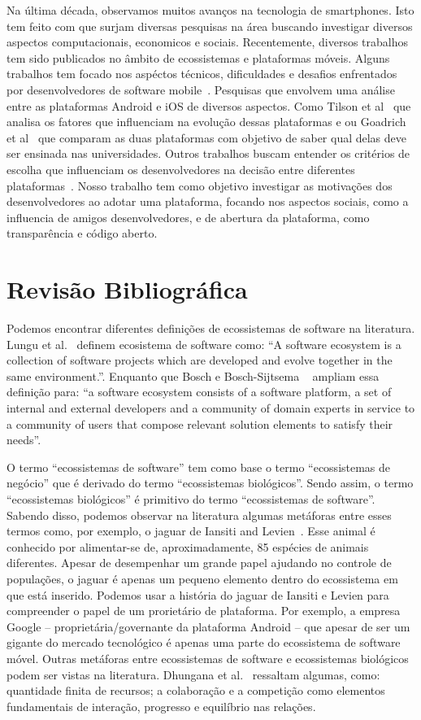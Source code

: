 \documentclass[conference]{IEEEtran}
\begin{document}
Na última década, observamos muitos avanços na tecnologia de smartphones. Isto tem feito com que surjam diversas pesquisas na área buscando investigar diversos aspectos computacionais, economicos e sociais. Recentemente, diversos trabalhos tem sido publicados no âmbito de ecossistemas e plataformas móveis. Alguns trabalhos tem focado nos aspéctos técnicos, dificuldades e desafios enfrentados por desenvolvedores de software mobile~\cite{Joorabchi2013}. Pesquisas que envolvem uma análise entre as plataformas Android e iOS de diversos aspectos. Como Tilson et al~\cite{Tilson2012} que analisa os fatores que influenciam na evolução dessas plataformas e ou Goadrich et al~\cite{Goadrich2011} que comparam as duas plataformas com objetivo de saber qual delas deve ser ensinada nas universidades. Outros trabalhos buscam entender os critérios de escolha que influenciam os desenvolvedores na decisão entre diferentes plataformas~\cite{Koch2014}. Nosso trabalho tem como objetivo investigar as motivações dos desenvolvedores ao adotar uma plataforma, focando nos aspectos sociais, como a influencia de amigos desenvolvedores, e de abertura da plataforma, como transparência e código aberto.


\section{Revisão Bibliográfica}

Podemos encontrar diferentes definições de ecossistemas de software na literatura. Lungu et al.~\cite{Lungu2010264} definem ecosistema de software como: “A software ecosystem is a collection of software projects which are developed and evolve together in the same environment.”. Enquanto que Bosch e Bosch-Sijtsema ~\cite{Bosch201067} ampliam essa definição para: “a software ecosystem consists of a software platform, a set of internal and external developers and a community of domain experts in service to a community of users that compose relevant solution elements to satisfy their needs”.  

O termo “ecossistemas de software” tem como base o termo “ecossistemas de negócio” que é derivado do termo “ecossistemas biológicos”. Sendo assim, o termo “ecossistemas biológicos” é primitivo do termo “ecossistemas de software”. Sabendo disso, podemos observar na literatura algumas metáforas entre esses termos como, por exemplo, o jaguar de Iansiti and Levien~\cite{Iansiti2004}. Esse animal é conhecido por alimentar-se de, aproximadamente, 85 espécies de animais diferentes. Apesar de desempenhar um grande papel ajudando no controle de populações, o jaguar é apenas um pequeno elemento dentro do ecossistema em que está inserido. Podemos usar a história do jaguar de Iansiti e Levien para compreender o papel de um prorietário de plataforma. Por exemplo, a empresa Google -- proprietária/governante da plataforma Android -- que apesar de ser um gigante do mercado tecnológico é apenas uma parte do ecossistema de software móvel. Outras metáforas entre ecossistemas de software e ecossistemas biológicos podem ser vistas na literatura. Dhungana et al.~\cite{Dhungana2010} ressaltam algumas, como: quantidade finita de recursos; a colaboração e a competição como elementos fundamentais de interação, progresso e equilíbrio nas relações. 
\end{document}
